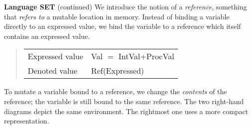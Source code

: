 \begin{minipage}[t]{\sw}
\slidenumber
\LARGE
{\bf Language SET} (continued)\exx
We introduce the notion of a {\em reference},
something that {\em refers to} a mutable location in memory.
Instead of binding a variable directly to an expressed value,
we bind the variable to a reference
which itself contains an expressed value.
\begin{quote}
\begin{tabular}{@{}l@{ $=$ }l}
Expressed value & Val $=$ IntVal+ProcVal \\
Denoted value & Ref(Expressed) \\
\end{tabular}
\end{quote}
To mutate a variable bound to a reference,
we change the {\em contents} of the reference;
the variable is still bound to the same reference.
\vspace{2ex}
The two right-hand diagrams depict the same environment.
The rightmost one uses a more compact representation.
\end{minipage}
\clearpage
